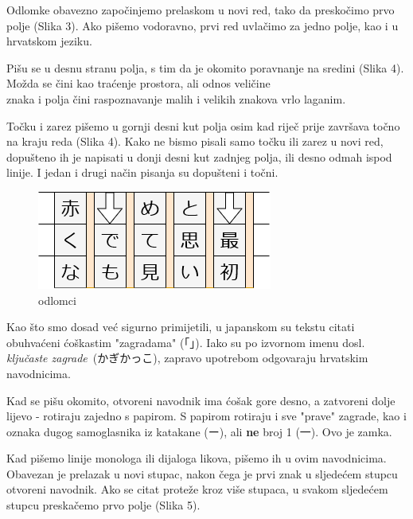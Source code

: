 		
	Odlomke obavezno započinjemo prelaskom u novi red, tako da preskočimo prvo polje (Slika 3). Ako pišemo vodoravno, prvi red uvlačimo za jedno polje, kao i u hrvatskom jeziku.

	
	Pišu se u desnu stranu polja, s tim da je okomito poravnanje na sredini (Slika 4). Možda se čini kao traćenje prostora, ali odnos veličine\\ znaka i polja čini raspoznavanje malih i velikih znakova vrlo laganim.
	
	
	
	Točku i zarez pišemo u gornji desni kut polja osim kad riječ prije završava točno na kraju reda (Slika 4). Kako ne bismo pisali samo točku ili zarez u novi red, dopušteno ih je napisati u donji desni kut zadnjeg polja, ili desno odmah ispod linije. I jedan i drugi način pisanja su dopušteni i točni.
	
	\newpage
	
	
	\begin{figure}
		\centering
		\includegraphics[width=.3\textwidth]{017_pisanje_res/a3.png}
		\caption{odlomci}
	\end{figure}

	Kao što smo dosad već sigurno primijetili, u japanskom su tekstu citati obuhvaćeni ćoškastim "zagradama" (「」). Iako su po izvornom imenu dosl. \textit{ključaste zagrade}\ (かぎかっこ), zapravo upotrebom odgovaraju hrvatskim navodnicima.
	
	Kad se pišu okomito, otvoreni navodnik ima ćošak gore desno, a zatvoreni dolje lijevo - rotiraju zajedno s papirom. S papirom rotiraju i sve "prave" zagrade, kao i oznaka dugog samoglasnika iz katakane (ー), ali \textbf{ne} broj 1 (一). Ovo je zamka.
	
	Kad pišemo linije monologa ili dijaloga likova, pišemo ih u ovim navodnicima. Obavezan je prelazak u novi stupac, nakon čega je prvi znak u sljedećem stupcu otvoreni navodnik. Ako se citat proteže kroz više stupaca, u svakom sljedećem stupcu preskačemo prvo polje (Slika 5).
	
